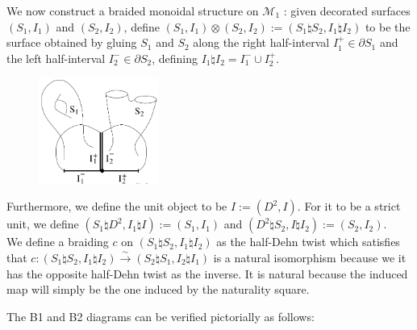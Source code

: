 \documentclass[reqno]{amsart}
\theoremstyle{definition}
\theoremstyle{remark}
\begin{document}
   We now construct a braided monoidal structure on
   $\mathcal{M}_1$ : given decorated surfaces
   $\left( S_1, I_1 \right) $ and
   $\left( S_2,I_2 \right) $, define
   $\left( S_1, I_1 \right) 
   \otimes \left( S_2, I_2 \right) 
   := \left( S_1 \natural S_2, I_1 \natural I_2 \right) $ to be
   the surface obtained by gluing
   $S_1$ and $S_2$ along the right half-interval
   $I_1^{+} \in \partial S_1$ and the
   left half-interval $I_2^{-} \in \partial S_2$, defining
   $I_1 \natural I_2 = I_1^{-} \cup I_2^{+}$.

   \begin{figure}[htpb]
       \centering
       \includegraphics[width=0.35\textwidth]{connected-sum.png}
       \label{fig:connected-sum-png}
   \end{figure}

   Furthermore, we define the unit object to be
   $I := \left( D^2, I \right) $. For it to be a strict unit, 
   we define $\left( S_1 \natural D^2, I_1 \natural I \right) 
   := \left( S_1, I_1 \right) $ and
   $\left( D^2 \natural S_2, I \natural I_2 \right) :=
   \left( S_2, I_2 \right) $.\\
   

   We define a braiding $c$ on
   $\left( S_1 \natural S_2, I_1 \natural I_2 \right) $ 
   as the half-Dehn twist which satisfies that
   $c \colon \left( S_1 \natural S_2, I_1 \natural I_2 \right) 
   \stackrel{\sim}{\to } \left( S_2 \natural S_1, I_2 \natural I_1 \right)  $
   is a natural isomorphism because we
   it has the opposite half-Dehn twist as the inverse. It is
   natural because the induced map will simply be the one induced by
   the naturality square.

   The B1 and B2 diagrams can be verified pictorially as follows:
\end{document}
